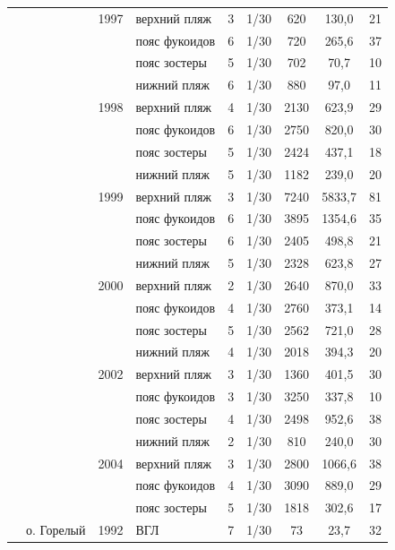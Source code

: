 \documentclass[12pt, a4paper]{disser}
\begin{document}
\begin{footnotesize}
\begin{longtable}{|p{2cm}|p{3cm}|p{1cm}|p{2cm}|p{1.5cm}|p{1cm}|*{3}{c|}}
		 &  & 1997 & верхний пляж & 3 & 1/30 & 620 & 130,0 & 21
		\\ \cline{4-9}
		 &  &  & пояс фукоидов & 6 & 1/30 & 720 & 265,6 & 37
		\\ \cline{4-9}
		 &  &  & пояс зостеры & 5 & 1/30 & 702 & 70,7 & 10
		\\ \cline{4-9}
		 &  &  & нижний пляж & 6 & 1/30 & 880 & 97,0 & 11
		\\ \cline{3-9}
		 &  & 1998 & верхний пляж & 4 & 1/30 & 2130 & 623,9 & 29
		\\ \cline{4-9}
		 &  &  & пояс фукоидов & 6 & 1/30 & 2750 & 820,0 & 30
		\\ \cline{4-9}
		 &  &  & пояс зостеры & 5 & 1/30 & 2424 & 437,1 & 18
		\\ \cline{4-9}
		 &  &  & нижний пляж & 5 & 1/30 & 1182 & 239,0 & 20
		\\ \cline{3-9}
		 &  & 1999 & верхний пляж & 3 & 1/30 & 7240 & 5833,7 & 81
		\\ \cline{4-9}
		 &  &  & пояс фукоидов & 6 & 1/30 & 3895 & 1354,6 & 35
		\\ \cline{4-9}
		 &  &  & пояс зостеры & 6 & 1/30 & 2405 & 498,8 & 21
		\\ \cline{4-9}
		 &  &  & нижний пляж & 5 & 1/30 & 2328 & 623,8 & 27
		\\ \cline{3-9}
		 &  & 2000 & верхний пляж & 2 & 1/30 & 2640 & 870,0 & 33
		\\ \cline{4-9}
		 &  &  & пояс фукоидов & 4 & 1/30 & 2760 & 373,1 & 14
		\\ \cline{4-9}
		 &  & & пояс зостеры & 5 & 1/30 & 2562 & 721,0 & 28
		\\ \cline{4-9}
		 &  &  & нижний пляж & 4 & 1/30 & 2018 & 394,3 & 20
		\\ \cline{3-9}
		 &  & 2002 & верхний пляж & 3 & 1/30 & 1360 & 401,5 & 30
		\\ \cline{4-9}
		 &  &  & пояс фукоидов & 3 & 1/30 & 3250 & 337,8 & 10
		\\ \cline{4-9}
		 &  &  & пояс зостеры & 4 & 1/30 & 2498 & 952,6 & 38
		\\ \cline{4-9}
		 &  &  & нижний пляж & 2 & 1/30 & 810 & 240,0 & 30
		\\ \cline{3-9}
		 &  & 2004 & верхний пляж & 3 & 1/30 & 2800 & 1066,6 & 38
		\\ \cline{4-9}
		 &  &  & пояс фукоидов & 4 & 1/30 & 3090 & 889,0 & 29
		\\ \cline{4-9}
		 &  &  & пояс зостеры & 5 & 1/30 & 1818 & 302,6 & 17
		\\ \cline{2-9}
		 & о. Горелый & 1992 & ВГЛ & 7 & 1/30 & 73 & 23,7 & 32

\end{longtable}
\end{footnotesize}
\end{document}
